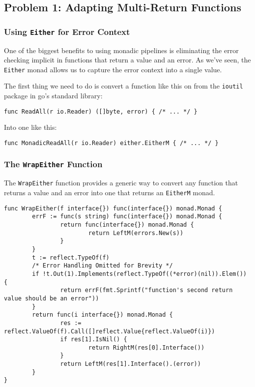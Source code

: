 \documentclass{beamer}
\begin{document}
\subsection{Problem 1: Adapting Multi-Return Functions}
\begin{frame}[fragile]
  \frametitle{Using {\tt Either} for Error Context}
  One of the biggest benefits to using monadic pipelines is
  eliminating the error checking implicit in functions that return a
  value and an error.  As we've seen, the {\tt Either} monad allows us
  to capture the error context into a single value.
  \par\pause
  The first thing we need to do is convert a function like this on
  from the {\tt ioutil} package in go's standard library:
\begin{lstlisting}[language=Golang]
func ReadAll(r io.Reader) ([]byte, error) { /* ... */ }
\end{lstlisting}
  \par\pause
  Into one like this:
\begin{lstlisting}[language=Golang]
func MonadicReadAll(r io.Reader) either.EitherM { /* ... */ }
\end{lstlisting}
\end{frame}

\begin{frame}[fragile]
  \frametitle{The {\tt WrapEither} Function}
  The {\tt WrapEither} function provides a generic way to convert any
  function that returns a value and an error into one that returns an
  {\tt EitherM} monad.
  \\\vfill
  \par\pause
\begin{lstlisting}[language=Golang]
func WrapEither(f interface{}) func(interface{}) monad.Monad {
        errF := func(s string) func(interface{}) monad.Monad {
                return func(interface{}) monad.Monad {
                        return LeftM(errors.New(s))
                }
        }
        t := reflect.TypeOf(f)
        /* Error Handling Omitted for Brevity */
        if !t.Out(1).Implements(reflect.TypeOf((*error)(nil)).Elem()) {
                return errF(fmt.Sprintf("function's second return value should be an error"))
        }
        return func(i interface{}) monad.Monad {
                res := reflect.ValueOf(f).Call([]reflect.Value{reflect.ValueOf(i)})
                if res[1].IsNil() {
                        return RightM(res[0].Interface())
                }
                return LeftM(res[1].Interface().(error))
        }
}
\end{lstlisting}
\end{frame}
\end{document}
